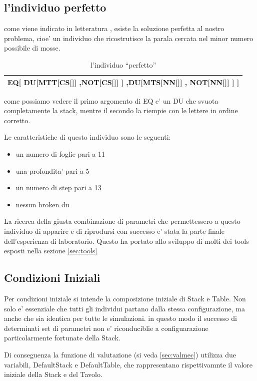 \documentclass[12pt, a4paper]{article}
\begin{document}
\subsection{l'individuo perfetto}
come viene indicato in letteratura \cite{mitchell}, esiste la soluzione perfetta al nostro problema, cioe' un individuo che ricostrutisce la parala cercata nel minor numero possibile di mosse.
\begin{table}[h]
\begin{tabular}{|c|}
\hline
EQ[ DU[MTT[CS[]] ,NOT[CS[]]  ] ,DU[MTS[NN[]] , NOT[NN[]] ]  ]\\
\hline
\end{tabular}
\caption{l'individuo ``perfetto''}
\label{table:perf}
\end{table}

come possiamo vedere il primo argomento di EQ e' un DU che svuota completamente la stack, mentre il secondo la riempie con le lettere in ordine corretto.

Le caratteristiche di questo individuo sono le seguenti:
\begin{itemize}
\item un numero di foglie pari a 11
\item una profondita' pari a 5
\item un numero di step pari a 13
\item nessun broken du
\label{item:perf}
\end{itemize}

La ricerca della giusta combinazione di parametri che permettessero a questo individuo di apparire e di riprodursi con successo e' stata la parte finale dell'esperienza di laboratorio.
Questo ha portato allo sviluppo di molti dei tools esposti nella sezione \ref{sec:tools}

\subsection{Condizioni Iniziali}
Per condizioni iniziale si intende la composizione iniziale di Stack e Table. Non solo e' essenziale che tutti gli individui partano dalla stessa configurazione, ma anche che sia identica per tutte le simulazioni. in questo modo il successo di determinati set di parametri non e' riconduciblie a configuarazione particolarmente fortunate della Stack.

Di conseguenza la funzione di valutazione (si veda \ref{sec:valmec}) utilizza due variabili, DefaultStack e DefaultTable, che rappresentano rispettivamnte il valore iniziale della Stack e del Tavolo.
\end{document}
